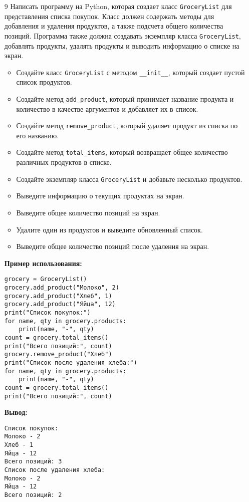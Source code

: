 \begin{enumerate}
\item[9] Написать программу на Python, которая создает класс \texttt{GroceryList} для представления списка покупок. Класс должен содержать методы для добавления и удаления продуктов, а также подсчета общего количества позиций. Программа также должна создавать экземпляр класса \texttt{GroceryList}, добавлять продукты, удалять продукты и выводить информацию о списке на экран.

\begin{itemize}
    \item Создайте класс \texttt{GroceryList} с методом \texttt{\_\_init\_\_}, который создает пустой список продуктов.
    \item Создайте метод \texttt{add\_product}, который принимает название продукта и количество в качестве аргументов и добавляет их в список.
    \item Создайте метод \texttt{remove\_product}, который удаляет продукт из списка по его названию.
    \item Создайте метод \texttt{total\_items}, который возвращает общее количество различных продуктов в списке.
    \item Создайте экземпляр класса \texttt{GroceryList} и добавьте несколько продуктов.
    \item Выведите информацию о текущих продуктах на экран.
    \item Выведите общее количество позиций на экран.
    \item Удалите один из продуктов и выведите обновленный список.
    \item Выведите общее количество позиций после удаления на экран.
\end{itemize}

\textbf{Пример использования:}

\begin{verbatim}
grocery = GroceryList()
grocery.add_product("Молоко", 2)
grocery.add_product("Хлеб", 1)
grocery.add_product("Яйца", 12)
print("Список покупок:")
for name, qty in grocery.products:
    print(name, "-", qty)
count = grocery.total_items()
print("Всего позиций:", count)
grocery.remove_product("Хлеб")
print("Список после удаления хлеба:")
for name, qty in grocery.products:
    print(name, "-", qty)
count = grocery.total_items()
print("Всего позиций:", count)
\end{verbatim}

\textbf{Вывод:}
\begin{verbatim}
Список покупок:
Молоко - 2
Хлеб - 1
Яйца - 12
Всего позиций: 3
Список после удаления хлеба:
Молоко - 2
Яйца - 12
Всего позиций: 2
\end{verbatim}


\end{enumerate}
